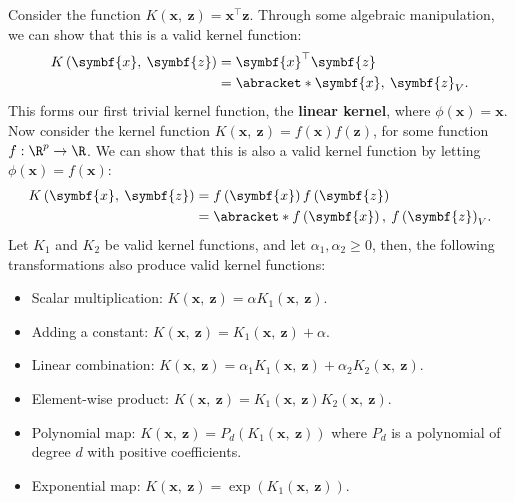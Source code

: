 \documentclass{article}
\begin{document}
Consider the function \(K\left( \symbf{x},\: \symbf{z} \right) =
\symbf{x}^\top \symbf{z}\). Through some algebraic manipulation, we can
show that this is a valid kernel function:
\begin{align*}
    K\left( \symbf{x},\: \symbf{z} \right) & = \symbf{x}^\top \symbf{z}              \\
                                           & = \abracket*{\symbf{x},\: \symbf{z}}_V.
\end{align*}
This forms our first trivial kernel function, the \textbf{linear kernel},
where \(\phi\left( \symbf{x} \right) = \symbf{x}\).
Now consider the kernel function \(K\left( \symbf{x},\: \symbf{z}
\right) = f\left( \symbf{x} \right) f\left( \symbf{z} \right)\), for
some function \(f: \R^p \to \R\). We can show that this is also a valid
kernel function by letting \(\phi\left( \symbf{x} \right) = f\left( \symbf{x} \right)\):
\begin{align*}
    K\left( \symbf{x},\: \symbf{z} \right) & = f\left( \symbf{x} \right) f\left( \symbf{z} \right)                   \\
                                           & = \abracket*{f\left( \symbf{x} \right),\: f\left( \symbf{z} \right)}_V.
\end{align*}
Let \(K_1\) and \(K_2\) be valid kernel functions, and let
\(\alpha_1, \alpha_2 \geqslant 0\), then, the following transformations
also produce valid kernel functions:
\begin{itemize}
    \item Scalar multiplication: \(K\left( \symbf{x},\: \symbf{z}
          \right) = \alpha K_1\left( \symbf{x},\: \symbf{z} \right)\).
    \item Adding a constant: \(K\left( \symbf{x},\: \symbf{z} \right) =
          K_1\left( \symbf{x},\: \symbf{z} \right) + \alpha\).
    \item Linear combination: \(K\left( \symbf{x},\: \symbf{z} \right)
          = \alpha_1 K_1\left( \symbf{x},\: \symbf{z} \right) +
          \alpha_2 K_2\left( \symbf{x},\: \symbf{z} \right)\).
    \item Element-wise product: \(K\left( \symbf{x},\: \symbf{z}
          \right) = K_1\left( \symbf{x},\: \symbf{z} \right) K_2\left(
          \symbf{x},\: \symbf{z} \right)\).
    \item Polynomial map: \(K\left( \symbf{x},\: \symbf{z} \right) =
          P_d\left( K_1\left( \symbf{x},\: \symbf{z} \right) \right)\)
          where \(P_d\) is a polynomial of degree \(d\) with positive
          coefficients.
    \item Exponential map: \(K\left( \symbf{x},\: \symbf{z} \right) =
          \exp{\left( K_1\left( \symbf{x},\: \symbf{z} \right)
          \right)}\).
\end{itemize}
\end{document}
